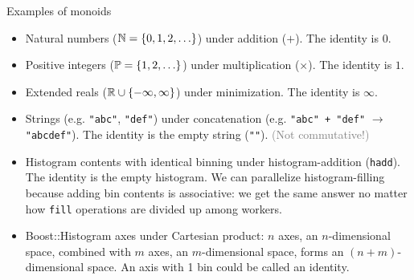 \documentclass[aspectratio=169]{beamer}
\begin{document}
\begin{frame}{Examples of monoids}
\large
\vspace{0.5 cm}

\begin{itemize}\setlength{\itemsep}{0.25 cm}
\item<1-> Natural numbers ($\Bbb{N} = \{0, 1, 2, \ldots\}$) under addition ($+$). The identity is $0$.
\item<2-> Positive integers ($\Bbb{P} = \{1, 2, \ldots\}$) under multiplication ($\times$). The identity is $1$.
\item<3-> Extended reals ($\Bbb{R} \cup \{-\infty, \infty\}$) under minimization. The identity is $\infty$.
\item<4-> Strings (e.g. \texttt{"abc"}, \texttt{"def"}) under concatenation (e.g. \texttt{"abc" + "def"} $\to$ \texttt{"abcdef"}). The identity is the empty string (\texttt{""}). \textcolor{gray}{(Not commutative!)}
\item<5-> Histogram contents with identical binning under histogram-addition (\texttt{hadd}). The identity is the empty histogram. We can parallelize histogram-filling because adding bin contents is associative: we get the same answer no matter how \texttt{fill} operations are divided up among workers.
\item<6-> Boost::Histogram axes under Cartesian product: $n$ axes, an $n$-dimensional space, combined with $m$ axes, an $m$-dimensional space, forms an $(n + m)$-dimensional space. An axis with 1 bin could be called an identity.
\end{itemize}
\end{frame}
\end{document}
